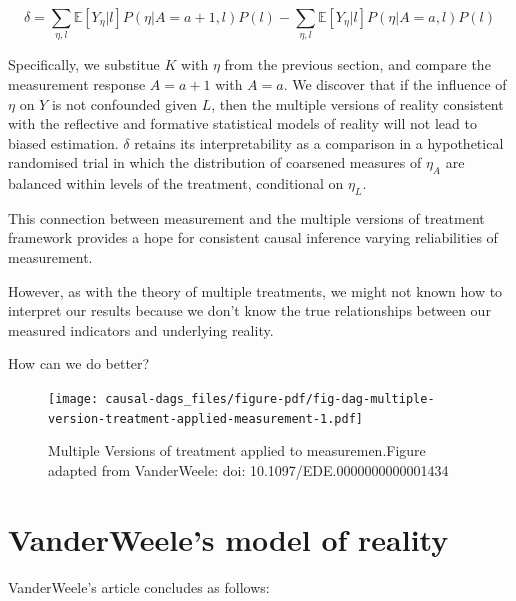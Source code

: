 \documentclass[
  singlecolumn]{report}
\begin{document}
\[\delta = \sum_{\eta,l} \mathbb{E}[Y_\eta|l] P(\eta|A=a+1,l) P(l) - \sum_{\eta,l} \mathbb{E}[Y_\eta|l] P(\eta|A=a,l) P(l)\]

Specifically, we substitue \(K\) with \(\eta\) from the previous
section, and compare the measurement response \(A = a + 1\) with
\(A = a\). We discover that if the influence of \(\eta\) on \(Y\) is not
confounded given \(L\), then the multiple versions of reality consistent
with the reflective and formative statistical models of reality will not
lead to biased estimation. \(\delta\) retains its interpretability as a
comparison in a hypothetical randomised trial in which the distribution
of coarsened measures of \(\eta_A\) are balanced within levels of the
treatment, conditional on \(\eta_L\).

This connection between measurement and the multiple versions of
treatment framework provides a hope for consistent causal inference
varying reliabilities of measurement.

However, as with the theory of multiple treatments, we might not known
how to interpret our results because we don't know the true
relationships between our measured indicators and underlying reality.

How can we do better?

\begin{figure}

{\centering \texttt{[image: causal-dags\_files/figure-pdf/fig-dag-multiple-version-treatment-applied-measurement-1.pdf]}

}

\caption{\label{fig-dag-multiple-version-treatment-applied-measurement}Multiple
Versions of treatment applied to measuremen.Figure adapted from
VanderWeele: doi: 10.1097/EDE.0000000000001434}

\end{figure}

\hypertarget{vanderweeles-model-of-reality}{%
\section{VanderWeele's model of
reality}\label{vanderweeles-model-of-reality}}

VanderWeele's article concludes as follows:
\end{document}

